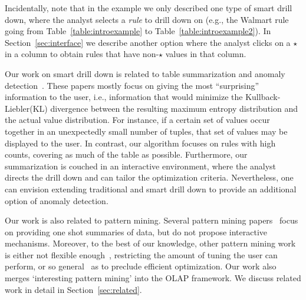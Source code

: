 Incidentally, note that in the example we only described one type of smart drill down,
where the analyst selects a {\em rule} to drill down on
(e.g., the Walmart rule going from Table~\ref{table:introexample} to
Table~\ref{table:introexample2}).
In Section~\ref{sec:interface} we describe another option
where the analyst clicks on a $\star$ in a column to obtain
rules that have non-$\star$ values in that column.

Our work on smart drill down is related
to table summarization and anomaly
detection~\cite{Sarawagi:2001:UMA:767141.767148,
Sarawagi00user-adaptiveexploration,
Sarawagi98discovery-drivenexploration,
DBLP:journals/pvldb/GebalyAGKS14}.
These papers mostly focus on
giving the most ``surprising'' information to the user, i.e., information
that would minimize the Kullback-Liebler(KL) divergence between the
resulting maximum entropy distribution and the actual value distribution. For instance, if a certain set of
values occur together in an unexpectedly small number of tuples, that
set of values may be displayed to the user. In contrast, our algorithm
focuses on rules with high counts, covering as
much of the table as possible.
Furthermore, our summarization is couched in
an interactive environment, where the analyst
directs the drill down and can tailor the optimization criteria.
Nevertheless, one can envision extending traditional
and smart drill down to provide an additional option of anomaly detection. 

Our work is also related to pattern mining. Several pattern mining papers~\cite{Vreeken:2011:KMI:1969593.1969615,Bringmann:2007:ICDM,Yan:2005:SIP:1081870.1081907} focus on providing one shot summaries of data, but do not propose interactive mechanisms. Moreover, to the best of our knowledge, other pattern mining work is either not flexible enough~\cite{Goethals:2011:MFI:2020408.2020529,Tatti:2014:FRI:2676651.2656261,DeBie:2010:FMI:1816112.1816117}, restricting the amount of tuning the user can perform, or so general~\cite{Leeuwen:2012:DSS:2347179.2347243} as to preclude efficient optimization. Our work also merges `interesting pattern mining' into the OLAP framework. We discuss related work in detail in Section~\ref{sec:related}.

